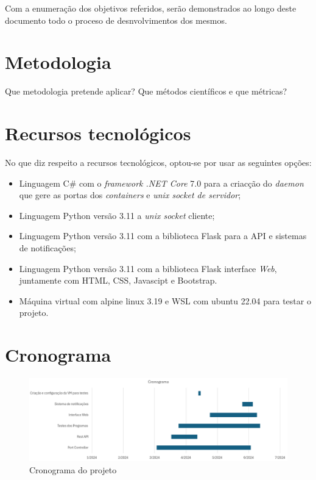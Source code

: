 Com a enumeração dos objetivos referidos, serão demonstrados ao longo deste documento
todo o proceso de desnvolvimentos dos mesmos.




\section{Metodologia}
\label{sec:intro_method}
Que metodologia pretende aplicar? Que métodos científicos e que métricas?

\section{Recursos tecnológicos}
\label{sec:intro_resources}


No que diz respeito a recursos tecnológicos, optou-se por usar as seguintes opções:

\begin{itemize}
\item Linguagem C\# com o \textit{framework .NET Core} 7.0 para a criacção do \textit{daemon} que gere
as portas dos \textit{containers} e \textit{unix socket de servidor};
\item Linguagem Python versão 3.11 a \textit{unix socket} cliente;
\item Linguagem Python versão 3.11 com a biblioteca Flask para a API e sistemas de notificações;
\item Linguagem Python versão 3.11 com a biblioteca Flask interface \textit{Web}, juntamente com HTML, CSS, Javascipt e Bootstrap.
\item Máquina virtual com alpine linux 3.19 e WSL com ubuntu 22.04 para testar o projeto.
\end{itemize}


\section{Cronograma}
\label{sec:intro_chronos}

\begin{figure}[H]
\begin{center}
\includegraphics[width=16cm]{figs/cronograma.png}
\caption{Cronograma do projeto}
\label{fig:bookstack}
\end{center}
\end{figure}

